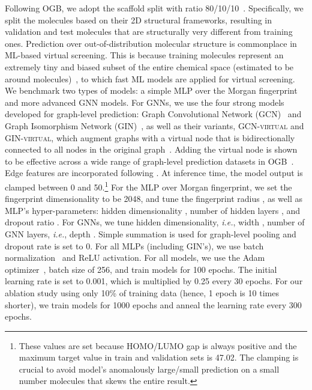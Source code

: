 \documentclass{article}
\newcommand{\nameshort}{OGB}
\newcommand{\ie}{\textit{i.e.}}
\begin{document}
{
Following \nameshort{}, we adopt the scaffold split with ratio 80/10/10~\citep{wu2018moleculenet}. Specifically, we split the molecules based on their 2D structural frameworks, resulting in validation and test molecules that are structurally very different from training ones.
Prediction over out-of-distribution molecular structure is commonplace in ML-based virtual screening. This is because training molecules represent an extremely tiny and biased subset of the entire chemical space (estimated to be around  molecules)~\citep{reymond2012exploring}, to which fast ML models are applied for virtual screening.
}
{
We benchmark two types of models: a simple MLP over the Morgan fingerprint~\citep{morgan1965generation} and more advanced GNN models.
For GNNs, we use the four strong models developed for graph-level prediction: Graph Convolutional Network (GCN)~\citep{kipf2016semi} and Graph Isomorphism Network (GIN)~\citep{xu2018how}, as well as their variants, \textsc{GCN-virtual} and \textsc{GIN-virtual}, which augment graphs with a virtual node that is bidirectionally connected to all nodes in the original graph~\citep{gilmer2017neural}.
Adding the virtual node is shown to be effective across a wide range of graph-level prediction datasets in \nameshort{}~\citep{hu2020open}.
Edge features are incorporated following \citet{hu2020pretraining}. At inference time, the model output is clamped between 0 and 50.\footnote{These values are set because HOMO/LUMO gap is always positive and the maximum target value in train and validation sets is 47.02. The clamping is crucial to avoid model's anomalously large/small prediction on a small number molecules that skews the entire result.}
}
{
For the MLP over Morgan fingerprint, we set the fingerprint dimensionality to be 2048, and tune the fingerprint radius , as well as MLP's hyper-parameters: hidden dimensionality , number of hidden layers , and dropout ratio .
For GNNs, we tune hidden dimensionality, \ie, width , number of GNN layers, \ie, depth . Simple summation is used for graph-level pooling and dropout rate is set to 0. 
For all MLPs (including \textsc{GIN}'s), we use batch normalization~\citep{ioffe2015batch} and ReLU activation.
For all models, we use the Adam optimizer~\citep{kingma2014adam}, batch size of 256, and train models for 100 epochs. The initial learning rate is set to 0.001, which is multiplied by 0.25 every 30 epochs. 
For our ablation study using only 10\% of training data (hence, 1 epoch is 10 times shorter), we train models for 1000 epochs and anneal the learning rate every 300 epochs.
}
\end{document}
